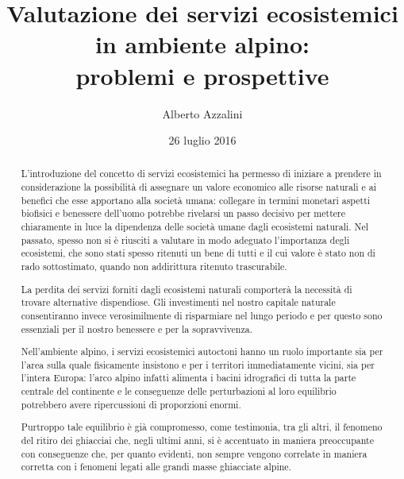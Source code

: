 \documentclass[14pt,a4paper]{article}
\author{Alberto Azzalini}
\title{Valutazione dei servizi ecosistemici in ambiente alpino:\\ problemi e prospettive}
\date{26 luglio 2016}
\begin{document}
	\maketitle
	\tableofcontents
	\begin{abstract}
		L'introduzione del concetto di servizi ecosistemici ha permesso di iniziare a prendere in considerazione la possibilità di assegnare un valore economico alle risorse naturali e ai benefici che esse apportano alla società umana: collegare in termini monetari aspetti biofisici e benessere dell'uomo potrebbe rivelarsi un passo decisivo per mettere chiaramente in luce la dipendenza delle società umane dagli ecosistemi naturali.
		Nel passato, spesso non si è riusciti a valutare in modo adeguato l'importanza degli ecosistemi, che sono stati spesso ritenuti un bene di tutti e il cui valore è stato non di rado sottostimato, quando non addirittura ritenuto trascurabile.
		
		La perdita dei servizi forniti dagli ecosistemi naturali comporterà la necessità di trovare alternative dispendiose. Gli investimenti nel nostro capitale naturale consentiranno invece verosimilmente di risparmiare nel lungo periodo e per questo sono essenziali per il nostro benessere e per la sopravvivenza.
		
		Nell'ambiente alpino, i servizi ecosistemici autoctoni hanno un ruolo importante sia per l'area sulla quale fisicamente insistono e per i territori immediatamente vicini, sia per l'intera Europa: l'arco alpino infatti alimenta i bacini idrografici di tutta la parte centrale del continente e le conseguenze delle perturbazioni al loro equilibrio potrebbero avere ripercussioni di proporzioni enormi.
		
		Purtroppo tale equilibrio è già compromesso, come testimonia, tra gli altri, il fenomeno del ritiro dei ghiacciai che, negli ultimi anni, si è accentuato in maniera preoccupante con conseguenze che, per quanto evidenti, non sempre vengono correlate in maniera corretta con i fenomeni legati alle grandi masse ghiacciate alpine.
		
		
	\end{abstract}
	
\end{document}
